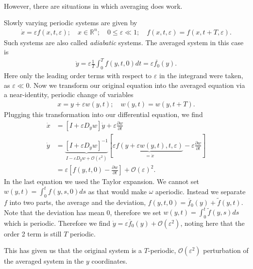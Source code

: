 However, there are situations in which averaging does work.
\begin{ex}
Slowly varying periodic systems are given by
\begin{align}
	\dot{x} = \varepsilon f(x, t, \varepsilon);\quad x \in \mathbb{R}^{n};\quad 0 \leq \varepsilon \ll 1;\quad f(x,t,\varepsilon) = f(x,t+T,\varepsilon).
\end{align}
Such systems are also called \emph{adiabatic} systems.
The averaged system in this case is
\begin{align}
	\dot{y} = \varepsilon \frac{1}{T} \int_{0}^{T} f(y,t,0)dt = \varepsilon \overline{f_0}(y).	
\end{align}
Here only the leading order terms with respect to $\varepsilon$ in the integrand were taken, as $\varepsilon \ll 0$. Now we transform our original equation into the averaged equation via a near-identity, periodic change of variables
\begin{align}
	x=y+\varepsilon w(y,t);\quad w(y,t) = w(y, t+T).
\end{align}
Plugging this transformation into our differential equation, we find
\begin{subequations}
\begin{align}
	\dot{x} &= \left[ I + \varepsilon D_{y}w\right]\dot{y} + \varepsilon \frac{\partial w}{\partial t} \\
	\dot{y} & = \underbrace{\left[ I + \varepsilon D_{y}w \right] ^{-1}}_{I - \varepsilon D_yw + \mathcal{O}(\varepsilon^2)}
	\left[\varepsilon  \underbrace{f(y+\varepsilon w(y,t),t,\varepsilon)}_{=\dot{x}} -\varepsilon \frac{\partial w}{\partial t} \right]\\ 
		&=\varepsilon \left[f(y,t,0) - \frac{\partial w}{\partial t}\right] + \mathcal{O}(\varepsilon)^2.
\end{align}
\end{subequations}
In the last equation we used the Taylor expansion. We cannot set $w(y,t) = \int_{0}^{t} f(y,s,0)ds$ as that would make $\omega $ aperiodic. Instead we separate $f$ into two parts, the average and the deviation, $f(y,t,0) = \overline{f}_0 (y) + \tilde{f}(y,t)$. Note that the deviation has mean 0, therefore we set $w(y,t) = \int_{0}^{t} \tilde{f}(y,s)ds$ which is periodic. Therefore we find $\dot{y} = \varepsilon \overline{f}_0(y) + \mathcal{O}(\varepsilon^2)$, noting here that the order 2 term is still $T$ periodic. 

This has given us that the original system is a $T$-periodic, $\mathcal{O}(\varepsilon^2)$ perturbation of the averaged system in the $y$ coordinates. 
\end{ex}

